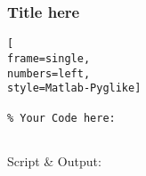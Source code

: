 \subsubsection{Title here}
\begin{lstlisting}[
frame=single,
numbers=left,
style=Matlab-Pyglike]

% Your Code here:


\end{lstlisting}

Script \& Output:

\begin{verbatim}

    
\end{verbatim}